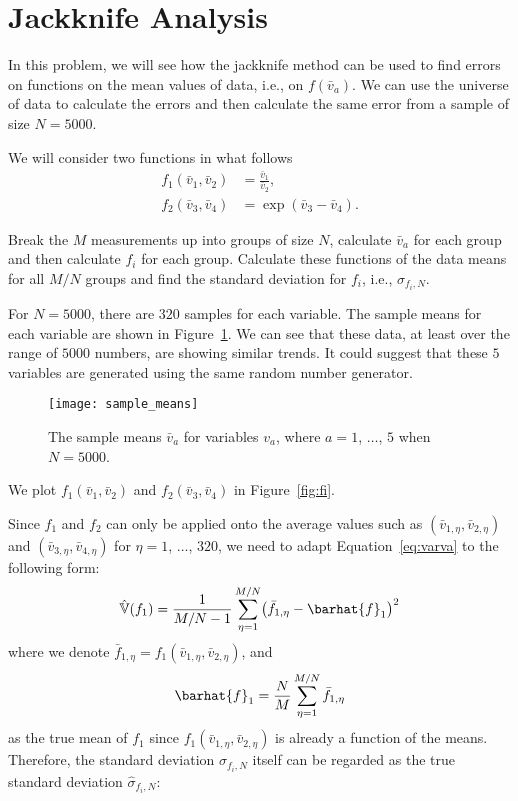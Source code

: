 \section{Jackknife Analysis}

In this problem, we will see how the jackknife method can be used to find errors on functions
on the mean values of data, i.e., on \(f(\bar{v}_a)\).
We can use the universe of data to calculate
the errors and then calculate the same error from a sample of size \(N = 5000\).

We will consider two functions in what follows
%
\begin{align}
    f_1(\bar{v}_1, \bar{v}_2) & = \frac{ \bar{v}_1 }{ \bar{v}_2 }, \\
    f_2(\bar{v}_3, \bar{v}_4) & = \exp( \bar{v}_3 - \bar{v}_4 ).
\end{align}

 Break the \(M\) measurements up into groups of size \(N\), calculate
\(\bar{v}_a\) for each group and then calculate \(f_i\) for each group.
Calculate these functions of the data means for all \(M/N\) groups and find the
standard deviation for \(f_i\), i.e., \(\hat{\sigma}_{f_i,N}\).

\Answer{}
For \(N = 5000\), there are \(320\) samples for each variable.
The sample means for each variable are shown in Figure~\ref{fig:sample_means}.
We can see that these data, at least over the range of \(5000\) numbers,
are showing similar trends.
It could suggest that these \(5\) variables are generated using the same random
number generator.

\begin{figure}[h]
    \centering
    \texttt{[image: sample\_means]}
    \caption{The sample means \(\bar{v}_a\) for variables \(v_a\), where
        \(a = 1\), \(\ldots\), \(5\) when \(N = 5000\).}
    \label{fig:sample_means}
\end{figure}

We plot \(f_1(\bar{v}_1, \bar{v}_2)\) and \(f_2(\bar{v}_3, \bar{v}_4)\) in
Figure~\ref{fig:fi}.

Since \(f_1\) and \(f_2\) can only be applied onto the average values such as
\((\bar{v}_{1,\eta}, \bar{v}_{2,\eta})\) and \((\bar{v}_{3,\eta}, \bar{v}_{4,\eta})\)
for \(\eta = 1\), \(\ldots\), \(320\), we need to adapt Equation~\eqref{eq:varva}
to the following form:
%
\begin{equation}
    \hat{\mathbb{V}}(f_1) = \frac{ 1 }{ M / N - 1 }
    \sum_{\eta=1}^{M/N} \bigl( \bar{f}_{1,\eta} - \barhat{f}_1 \bigr)^2
\end{equation}
%
where we denote \(\bar{f}_{1,\eta} = f_1(\bar{v}_{1,\eta}, \bar{v}_{2,\eta})\),
and
%
\begin{equation}
    \barhat{f}_1 = \frac{ N }{ M } \sum_{\eta=1}^{M/N} \bar{f}_{1,\eta}
\end{equation}
as the true mean of \(f_1\)
since \(f_1(\bar{v}_{1,\eta}, \bar{v}_{2,\eta})\) is already a function of the means.
Therefore, the standard deviation \(\sigma_{f_i,N}\) itself can be regarded
as the true standard deviation \(\hat{\sigma}_{f_i,N}\):

